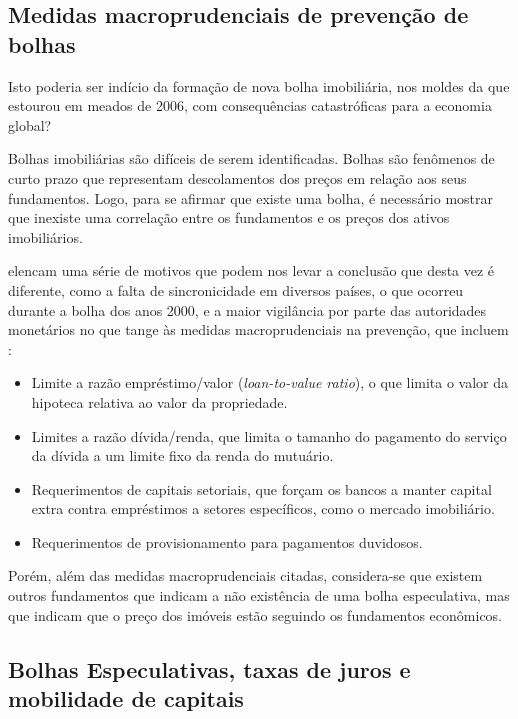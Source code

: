\documentclass[
	12pt,				%
	oneside,			%
	a4paper,			%
	chapter=TITLE,		%
	section=TITLE,		%
	english,			%
	brazil				%
	]{abntex2}
\begin{document}
\begin{refsection}
{\subsection{Medidas macroprudenciais de prevenção de bolhas}\label{medidas-macroprudenciais-de-prevenuxe7uxe3o-de-bolhas}}

Isto poderia ser indício da formação de nova bolha imobiliária, nos moldes da
que estourou em meados de 2006, com consequências catastróficas para a economia
global?

Bolhas imobiliárias são difíceis de serem identificadas. Bolhas são fenômenos
de curto prazo que representam descolamentos dos preços em relação aos seus
fundamentos. Logo, para se afirmar que existe uma bolha, é necessário mostrar
que inexiste uma correlação entre os fundamentos e os preços dos ativos
imobiliários.

\textcite{fmitwa} elencam uma série de motivos que podem nos levar a conclusão que desta
vez é diferente, como a falta de sincronicidade em diversos países, o que
ocorreu durante a bolha dos anos 2000, e a maior vigilância por parte das
autoridades monetários no que tange às medidas macroprudenciais na prevenção,
que incluem \autocite{fmiem}:
\begin{itemize}
\tightlist
\item
  Limite a razão empréstimo/valor (\emph{loan-to-value ratio}), o que limita o valor
  da hipoteca relativa ao valor da propriedade.
\item
  Limites a razão dívida/renda, que limita o tamanho do pagamento do serviço da
  dívida a um limite fixo da renda do mutuário.
\item
  Requerimentos de capitais setoriais, que forçam os bancos a manter capital
  extra contra empréstimos a setores específicos, como o mercado imobiliário.
\item
  Requerimentos de provisionamento para pagamentos duvidosos.
\end{itemize}
Porém, além das medidas macroprudenciais citadas, considera-se que existem
outros fundamentos que indicam a não existência de uma bolha especulativa, mas
que indicam que o preço dos imóveis estão seguindo os fundamentos econômicos.

\hypertarget{bolhas-especulativas-taxas-de-juros-e-mobilidade-de-capitais}{%
\subsection{Bolhas Especulativas, taxas de juros e mobilidade de capitais}\label{bolhas-especulativas-taxas-de-juros-e-mobilidade-de-capitais}}


\end{refsection}
\end{document}
